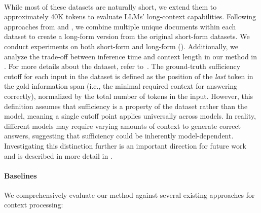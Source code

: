 \paragraph{}
While most of these datasets are naturally short, we extend them to approximately 40K tokens to evaluate LLMs' long-context capabilities. Following approaches from \citet{lostinmiddle} and \citet{infinitybench}, we combine multiple unique documents within each dataset to create a long-form version from the original short-form datasets. We conduct experiments on both short-form and long-form (). Additionally, we analyze the trade-off between inference time and context length in our method in . For more details about the dataset, refer to~. The ground-truth sufficiency cutoff for each input in the dataset is defined as the position of the \textit{last} token in the gold information span (i.e., the minimal required context for answering correctly), normalized by the total number of tokens in the input. However, this definition assumes that sufficiency is a property of the dataset rather than the model, meaning a single cutoff point applies universally across models. In reality, different models may require varying amounts of context to generate correct answers, suggesting that sufficiency could be inherently model-dependent. Investigating this distinction further is an important direction for future work and is described in more detail in . 


\paragraph{Baselines}
We comprehensively evaluate our method against several existing approaches for context processing:

